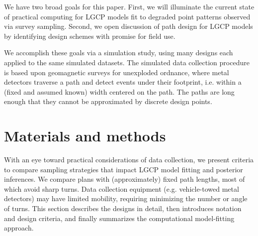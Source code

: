 \documentclass[review]{elsarticle}
\begin{document}
We have two broad goals for this paper. First, we will illuminate the current
state of practical computing for LGCP models fit to degraded point patterns
observed via survey sampling. Second, we open discussion of path design for
LGCP models by identifying design schemes with promise for field use.

We accomplish these goals via a simulation study, using many designs each
applied to the same simulated datasets. The simulated data collection procedure
is based upon geomagnetic surveys for unexploded ordnance, where metal
detectors traverse a path and detect events under their footprint, i.e. within
a (fixed and assumed known) width centered on the path. The paths are long
enough that they cannot be approximated by discrete design points.


\section{Materials and methods}


With an eye toward practical considerations of data collection, we present
criteria to compare sampling strategies that impact LGCP model fitting and
posterior inferences. We compare plans with (approximately) fixed path lengths,
most of which avoid sharp turns. Data collection equipment (e.g. vehicle-towed
metal detectors) may have limited mobility, requiring minimizing the number or
angle of turns. This section describes the designs in detail, then introduces
notation and design criteria, and finally summarizes the computational
model-fitting approach.
\end{document}
